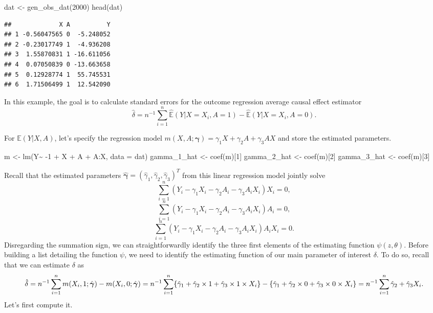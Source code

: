 \documentclass[
]{article}
\newenvironment{Shaded}{\begin{snugshade}}{\end{snugshade}}
\newcommand{\AttributeTok}[1]{\textcolor[rgb]{0.77,0.63,0.00}{#1}}
\newcommand{\DecValTok}[1]{\textcolor[rgb]{0.00,0.00,0.81}{#1}}
\newcommand{\FunctionTok}[1]{\textcolor[rgb]{0.00,0.00,0.00}{#1}}
\newcommand{\NormalTok}[1]{#1}
\newcommand{\OtherTok}[1]{\textcolor[rgb]{0.56,0.35,0.01}{#1}}
\newcommand{\SpecialCharTok}[1]{\textcolor[rgb]{0.00,0.00,0.00}{#1}}
\begin{document}
\begin{Shaded}
\begin{Highlighting}[]
\NormalTok{dat }\OtherTok{\textless{}{-}} \FunctionTok{gen\_obs\_dat}\NormalTok{(}\DecValTok{2000}\NormalTok{)}
\FunctionTok{head}\NormalTok{(dat)}
\end{Highlighting}
\end{Shaded}

\begin{verbatim}
##             X A          Y
## 1 -0.56047565 0  -5.248052
## 2 -0.23017749 1  -4.936208
## 3  1.55870831 1 -16.611056
## 4  0.07050839 0 -13.663658
## 5  0.12928774 1  55.745531
## 6  1.71506499 1  12.542090
\end{verbatim}

In this example, the goal is to calculate standard errors for the
outcome regression average causal effect estimator
\[\hat{\delta}=n^{-1}\sum_{i=1}^n\mathbb{\hat{E}}(Y|X=X_i, A=1)-\mathbb{\hat{E}}(Y|X=X_i, A=0).\]

For \(\mathbb{E}(Y|X, A)\), let's specify the regression model
\(m(X, A;\boldsymbol{\gamma})=\gamma_1X + \gamma_2A + \gamma_3AX\) and
store the estimated parameters.

\begin{Shaded}
\begin{Highlighting}[]
\NormalTok{m }\OtherTok{\textless{}{-}} \FunctionTok{lm}\NormalTok{(Y}\SpecialCharTok{\textasciitilde{}} \SpecialCharTok{{-}}\DecValTok{1} \SpecialCharTok{+}\NormalTok{ X }\SpecialCharTok{+}\NormalTok{ A }\SpecialCharTok{+}\NormalTok{ A}\SpecialCharTok{:}\NormalTok{X, }\AttributeTok{data =}\NormalTok{ dat)}
\NormalTok{gamma\_1\_hat }\OtherTok{\textless{}{-}} \FunctionTok{coef}\NormalTok{(m)[}\DecValTok{1}\NormalTok{]}
\NormalTok{gamma\_2\_hat }\OtherTok{\textless{}{-}} \FunctionTok{coef}\NormalTok{(m)[}\DecValTok{2}\NormalTok{]}
\NormalTok{gamma\_3\_hat }\OtherTok{\textless{}{-}} \FunctionTok{coef}\NormalTok{(m)[}\DecValTok{3}\NormalTok{]}
\end{Highlighting}
\end{Shaded}

Recall that the estimated parameters
\(\hat{\boldsymbol{\gamma}}=(\hat{\gamma}_1,\hat{\gamma}_2,\hat{\gamma}_3)^T\)
from this linear regression model jointly solve
\[\sum_{i=1}^n (Y_i-\gamma_1X_i - \gamma_2A_i - \gamma_3A_iX_i)X_i=0,\]
\[\sum_{i=1}^n (Y_i-\gamma_1X_i - \gamma_2A_i - \gamma_3A_iX_i)A_i=0,\]
\[\sum_{i=1}^n (Y_i-\gamma_1X_i - \gamma_2A_i - \gamma_3A_iX_i)A_iX_i=0.\]
Disregarding the summation sign, we can straightforwardly identify the
three first elements of the estimating function \(\psi(z,\theta)\).
Before building a list detailing the function \(\psi\), we need to
identify the estimating function of our main parameter of interest
\(\delta.\) To do so, recall that we can estimate \(\delta\) as
\[\hat{\delta}=n^{-1}\sum_{i=1}^nm(X_i,1;\hat{\boldsymbol{\gamma}})-m(X_i,0;\hat{\boldsymbol{\gamma}}) \\
=n^{-1}\sum_{i=1}^n\{\hat{\gamma}_1+ \hat{\gamma}_2 \times 1 +\hat{\gamma}_3 \times 1 \times X_i\} - 
\{\hat{\gamma}_1+ \hat{\gamma}_2 \times 0 +\hat{\gamma}_3 \times 0 \times X_i\} \\
=n^{-1}\sum_{i=1}^n \hat{\gamma}_2 +\hat{\gamma}_3 X_i.
\] Let's first compute it.
\end{document}
